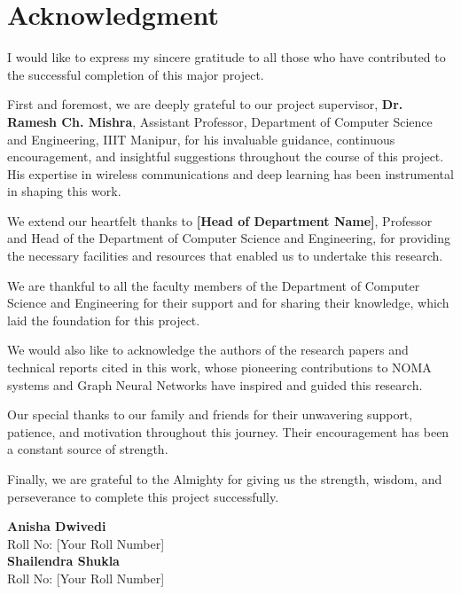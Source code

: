 \chapter*{Acknowledgment}

\vspace{1cm}

I would like to express my sincere gratitude to all those who have contributed to the successful completion of this major project.

First and foremost, we are deeply grateful to our project supervisor, \textbf{Dr. Ramesh Ch. Mishra}, Assistant Professor, Department of Computer Science and Engineering, IIIT Manipur, for his invaluable guidance, continuous encouragement, and insightful suggestions throughout the course of this project. His expertise in wireless communications and deep learning has been instrumental in shaping this work.

We extend our heartfelt thanks to \textbf{[Head of Department Name]}, Professor and Head of the Department of Computer Science and Engineering, for providing the necessary facilities and resources that enabled us to undertake this research.

We are thankful to all the faculty members of the Department of Computer Science and Engineering for their support and for sharing their knowledge, which laid the foundation for this project.

We would also like to acknowledge the authors of the research papers and technical reports cited in this work, whose pioneering contributions to NOMA systems and Graph Neural Networks have inspired and guided this research.

Our special thanks to our family and friends for their unwavering support, patience, and motivation throughout this journey. Their encouragement has been a constant source of strength.

Finally, we are grateful to the Almighty for giving us the strength, wisdom, and perseverance to complete this project successfully.

\vspace{2cm}

\begin{flushright}
\textbf{Anisha Dwivedi} \\
Roll No: [Your Roll Number] \\[1cm]
\textbf{Shailendra Shukla} \\
Roll No: [Your Roll Number]
\end{flushright}

\newpage
